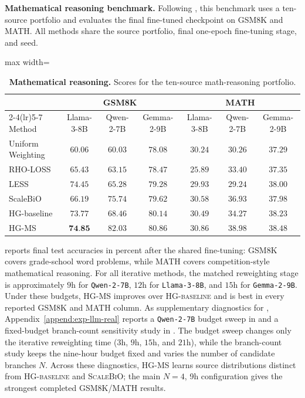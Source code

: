 \documentclass{article}
\theoremstyle{normaltheorem}
\begin{document}
\textbf{Mathematical reasoning benchmark.}
Following \citep[Section~4.2.2]{pan2025scalebio}, this benchmark uses a ten-source portfolio and evaluates the final fine-tuned checkpoint on GSM8K and MATH. All methods share the source portfolio, final one-epoch fine-tuning stage, and seed.
\begin{table}[t]
  \centering
  \caption{\textbf{Mathematical reasoning.}
Scores for the ten-source math-reasoning portfolio.}
  \label{tab:llm-realworld-math}
  \begin{adjustbox}{max width=\textwidth}
  \begin{tabular}{lcccccc}
    \toprule
    & \multicolumn{3}{c}{GSM8K} & \multicolumn{3}{c}{MATH} \\
    \cmidrule(lr){2-4}\cmidrule(lr){5-7}
    Method & Llama-3-8B & Qwen-2-7B & Gemma-2-9B & Llama-3-8B & Qwen-2-7B & Gemma-2-9B \\
    \midrule
    Uniform Weighting & $60.06$ & $60.03$ & $78.08$ & $30.24$ & $30.26$ & $37.29$ \\
    RHO-LOSS          & $65.43$ & $63.15$ & $78.47$ & $25.89$ & $33.40$ & $37.35$ \\
    LESS              & $74.45$ & $65.28$ & $79.28$ & $29.93$ & $29.24$ & $38.00$ \\
    ScaleBiO          & $66.19$ & $75.74$ & $79.62$ & $30.58$ & $36.93$ & $37.98$ \\
    HG-baseline       & $73.77$ & $68.46$ & $80.14$ & $30.49$ & $34.27$ & $38.23$ \\
    HG-MS             & $\textbf{74.85}$ & $\mathbf{82.03}$ & $\mathbf{80.86}$ & $\mathbf{30.86}$ & $\mathbf{38.98}$ & $\mathbf{38.48}$ \\
    \bottomrule
  \end{tabular}
  \end{adjustbox}
\end{table}
 reports final test accuracies in percent after the shared fine-tuning: GSM8K covers grade-school word problems, while MATH covers competition-style mathematical reasoning. For all iterative methods, the matched reweighting stage is approximately $9$h for \texttt{Qwen-2-7B}, $12$h for \texttt{Llama-3-8B}, and $15$h for \texttt{Gemma-2-9B}. Under these budgets, \textsc{HG-MS} improves over \textsc{HG-baseline} and is best in every reported GSM8K and MATH column. As supplementary diagnostics for , Appendix~\ref{append:exp-llm-real} reports a \texttt{Qwen-2-7B} budget sweep in  and a fixed-budget branch-count sensitivity study in . The budget sweep changes only the iterative reweighting time ($3$h, $9$h, $15$h, and $21$h), while the branch-count study keeps the nine-hour budget fixed and varies the number of candidate branches \(N\). Across these diagnostics, \textsc{HG-MS} learns source distributions distinct from \textsc{HG-baseline} and \textsc{ScaleBiO}; the main \(N=4\), 9h configuration gives the strongest completed GSM8K/MATH results.
\end{document}
